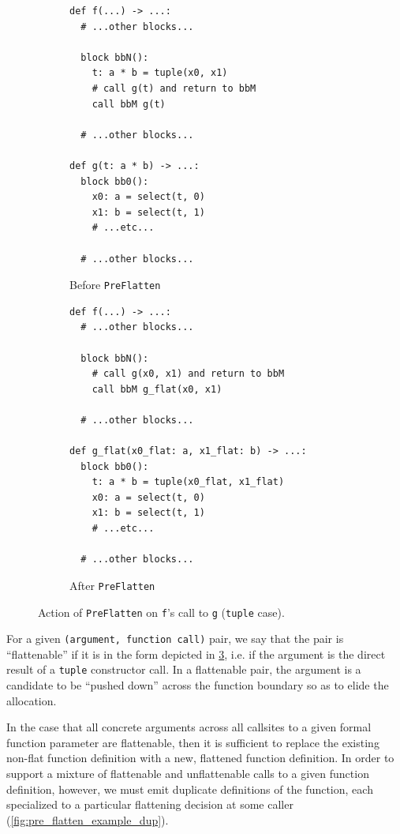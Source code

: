\begin{figure}[htbp]
  \centering
  \begin{subfigure}[t]{0.48\textwidth}
    \caption{Before \texttt{PreFlatten}}
    \label{fig:pre_flatten_before}
    \vspace{1mm}
\begin{verbatim}
def f(...) -> ...:
  # ...other blocks...

  block bbN():
    t: a * b = tuple(x0, x1)
    # call g(t) and return to bbM
    call bbM g(t)

  # ...other blocks...

def g(t: a * b) -> ...:
  block bb0():
    x0: a = select(t, 0)
    x1: b = select(t, 1)
    # ...etc...

  # ...other blocks...
\end{verbatim}
  \end{subfigure}\hfill
  \begin{subfigure}[t]{0.48\textwidth}
    \caption{After \texttt{PreFlatten}}
    \label{fig:pre_flatten_after}
    \vspace{1mm}
\begin{verbatim}
def f(...) -> ...:
  # ...other blocks...

  block bbN():
    # call g(x0, x1) and return to bbM
    call bbM g_flat(x0, x1)

  # ...other blocks...

def g_flat(x0_flat: a, x1_flat: b) -> ...:
  block bb0():
    t: a * b = tuple(x0_flat, x1_flat)
    x0: a = select(t, 0)
    x1: b = select(t, 1)
    # ...etc...

  # ...other blocks...
\end{verbatim}
  \end{subfigure}
  \caption{Action of \texttt{PreFlatten} on \texttt{f}'s call to \texttt{g} (\texttt{tuple} case).}
  \label{fig:pre_flatten_example}
\end{figure}

For a given \texttt{(argument, function call)} pair, we say that the pair is
``flattenable'' if it is in the form depicted in \cref{fig:pre_flatten_example},
i.e. if the argument is the direct result of a \texttt{tuple} constructor call.
In a flattenable pair, the argument is a candidate to be ``pushed down'' across
the function boundary so as to elide the allocation.

In the case that all concrete arguments across all callsites to a given formal
function parameter are flattenable, then it is sufficient to replace the
existing non-flat function definition with a new, flattened function definition.
In order to support a mixture of flattenable and unflattenable calls to a given
function definition, however, we must emit duplicate definitions of the
function, each specialized to a particular flattening decision at some caller
(\cref{fig:pre_flatten_example_dup}).

